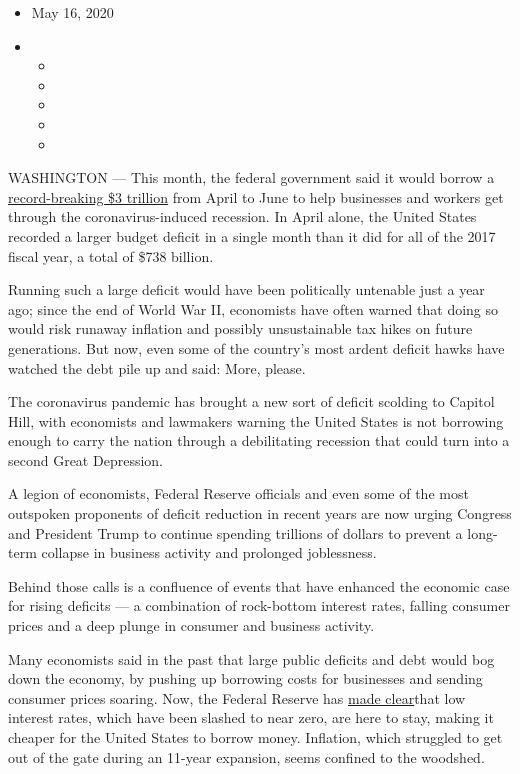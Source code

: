 \begin{itemize}
\item
  May 16, 2020
\item
  \begin{itemize}
  \item
  \item
  \item
  \item
  \item
  \end{itemize}
\end{itemize}

WASHINGTON --- This month, the federal government said it would borrow a
\href{https://www.reuters.com/article/us-usa-treasuries-borrowing/us-treasury-blasts-records-with-3-trillion-borrowing-need-this-quarter-idUSKBN22G28G}{record-breaking
\$3 trillion} from April to June to help businesses and workers get
through the coronavirus-induced recession. In April alone, the United
States recorded a larger budget deficit in a single month than it did
for all of the 2017 fiscal year, a total of \$738 billion.

Running such a large deficit would have been politically untenable just
a year ago; since the end of World War II, economists have often warned
that doing so would risk runaway inflation and possibly unsustainable
tax hikes on future generations. But now, even some of the country's
most ardent deficit hawks have watched the debt pile up and said: More,
please.

The coronavirus pandemic has brought a new sort of deficit scolding to
Capitol Hill, with economists and lawmakers warning the United States is
not borrowing enough to carry the nation through a debilitating
recession that could turn into a second Great Depression.

A legion of economists, Federal Reserve officials and even some of the
most outspoken proponents of deficit reduction in recent years are now
urging Congress and President Trump to continue spending trillions of
dollars to prevent a long-term collapse in business activity and
prolonged joblessness.

Behind those calls is a confluence of events that have enhanced the
economic case for rising deficits --- a combination of rock-bottom
interest rates, falling consumer prices and a deep plunge in consumer
and business activity.

Many economists said in the past that large public deficits and debt
would bog down the economy, by pushing up borrowing costs for businesses
and sending consumer prices soaring. Now, the Federal Reserve has
\href{https://www.nytimes3xbfgragh.onion/2020/04/29/business/economy/fed-coronavirus-interest-rates.html}{made
clear}that low interest rates, which have been slashed to near zero, are
here to stay, making it cheaper for the United States to borrow money.
Inflation, which struggled to get out of the gate during an 11-year
expansion, seems confined to the woodshed.

